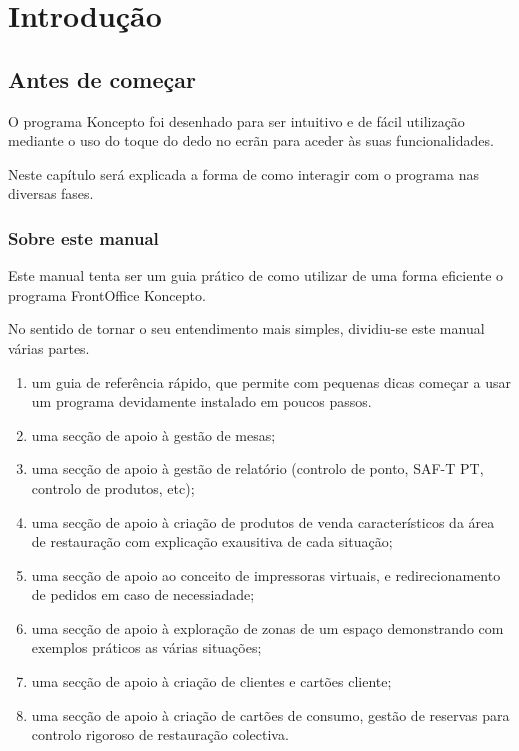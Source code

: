 \documentclass[a4paper,11pt,openany]{memoir}
\begin{document}
\newpage
\part{Introdução}

\chapter{Antes de começar}

O programa Koncepto foi desenhado para ser intuitivo e de fácil utilização mediante o uso do toque do dedo 
no ecrãn para aceder às suas funcionalidades. 

Neste capítulo será explicada a forma de como interagir com o programa nas diversas fases.

\section{Sobre este manual}

Este manual tenta ser um guia prático de como utilizar de uma forma eficiente o programa FrontOffice Koncepto.

No sentido de tornar o seu entendimento mais simples, dividiu-se este manual várias partes.

\begin{enumerate}
\item um guia de referência rápido, que permite com pequenas dicas começar a usar um programa devidamente instalado em poucos passos.
\item uma secção de apoio à gestão de mesas;
\item uma secção de apoio à gestão de relatório (controlo de ponto, SAF-T PT, controlo de produtos, etc);
\item uma secção de apoio à criação de produtos de venda característicos da área de restauração com explicação exausitiva de cada situação;
\item uma secção de apoio ao conceito de impressoras virtuais, e redirecionamento de pedidos em caso de necessiadade; 
\item uma secção de apoio à exploração de zonas de um espaço demonstrando com exemplos práticos as várias situações;
\item uma secção de apoio à criação de clientes e cartões cliente;
\item uma secção de apoio à criação de cartões de consumo, gestão de reservas para controlo rigoroso de restauração colectiva.
\end{enumerate}
\end{document}
